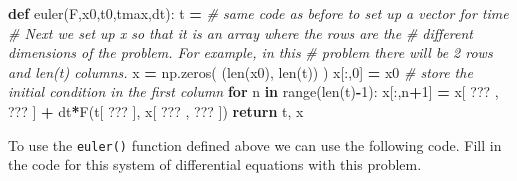 \documentclass[
]{book}
\newenvironment{Shaded}{\begin{snugshade}}{\end{snugshade}}
\newcommand{\BuiltInTok}[1]{#1}
\newcommand{\CommentTok}[1]{\textcolor[rgb]{0.56,0.35,0.01}{\textit{#1}}}
\newcommand{\ControlFlowTok}[1]{\textcolor[rgb]{0.13,0.29,0.53}{\textbf{#1}}}
\newcommand{\DecValTok}[1]{\textcolor[rgb]{0.00,0.00,0.81}{#1}}
\newcommand{\KeywordTok}[1]{\textcolor[rgb]{0.13,0.29,0.53}{\textbf{#1}}}
\newcommand{\NormalTok}[1]{#1}
\newcommand{\OperatorTok}[1]{\textcolor[rgb]{0.81,0.36,0.00}{\textbf{#1}}}
\theoremstyle{definition}
\theoremstyle{definition}
\theoremstyle{definition}
\theoremstyle{remark}
\begin{document}
\begin{Shaded}
\begin{Highlighting}[]
\KeywordTok{def}\NormalTok{ euler(F,x0,t0,tmax,dt):}
\NormalTok{    t }\OperatorTok{=} \CommentTok{\# same code as before to set up a vector for time}
    \CommentTok{\# Next we set up x so that it is an array where the rows are the }
    \CommentTok{\# different dimensions of the problem.  For example, in this }
    \CommentTok{\# problem there will be 2 rows and len(t) columns.}
\NormalTok{    x }\OperatorTok{=}\NormalTok{ np.zeros( (}\BuiltInTok{len}\NormalTok{(x0), }\BuiltInTok{len}\NormalTok{(t)) ) }
\NormalTok{    x[:,}\DecValTok{0}\NormalTok{] }\OperatorTok{=}\NormalTok{ x0 }\CommentTok{\# store the initial condition in the first column}
    \ControlFlowTok{for}\NormalTok{ n }\KeywordTok{in} \BuiltInTok{range}\NormalTok{(}\BuiltInTok{len}\NormalTok{(t)}\OperatorTok{{-}}\DecValTok{1}\NormalTok{):}
\NormalTok{        x[:,n}\OperatorTok{+}\DecValTok{1}\NormalTok{] }\OperatorTok{=}\NormalTok{ x[ ??? , ??? ] }\OperatorTok{+}\NormalTok{ dt}\OperatorTok{*}\NormalTok{F(t[ ??? ], x[ ??? , ??? ])}
    \ControlFlowTok{return}\NormalTok{ t, x}
\end{Highlighting}
\end{Shaded}

To use the \texttt{euler()} function defined above we can use the following code. Fill in the code for this system of differential equations with this problem.
\end{document}
